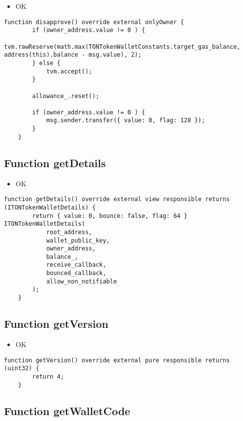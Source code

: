 \begin{itemize}
\item OK
\end{itemize}

\begin{lstlisting}[firstnumber=148]
    function disapprove() override external onlyOwner {
        if (owner_address.value != 0 ) {
            tvm.rawReserve(math.max(TONTokenWalletConstants.target_gas_balance, address(this).balance - msg.value), 2);
        } else {
            tvm.accept();
        }

        allowance_.reset();

        if (owner_address.value != 0 ) {
            msg.sender.transfer({ value: 0, flag: 128 });
        }
    }
\end{lstlisting}

\subsection{Function getDetails}

\begin{itemize}
\item OK
\end{itemize}

\begin{lstlisting}[firstnumber=72]
    function getDetails() override external view responsible returns (ITONTokenWalletDetails) {
        return { value: 0, bounce: false, flag: 64 } ITONTokenWalletDetails(
            root_address,
            wallet_public_key,
            owner_address,
            balance_,
            receive_callback,
            bounced_callback,
            allow_non_notifiable
        );
    }
\end{lstlisting}

\subsection{Function getVersion}

\begin{itemize}
\item OK
\end{itemize}

\begin{lstlisting}[firstnumber=54]
    function getVersion() override external pure responsible returns (uint32) {
        return 4;
    }
\end{lstlisting}

\subsection{Function getWalletCode}

